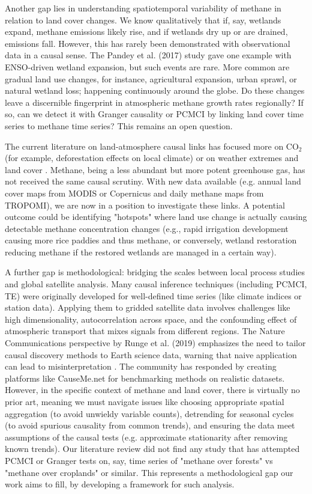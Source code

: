 Another gap lies in understanding spatiotemporal variability of methane in relation to land cover changes. We know qualitatively that if, say, wetlands expand, methane emissions likely rise, and if wetlands dry up or are drained, emissions fall. However, this has rarely been demonstrated with observational data in a causal sense. The Pandey et al. (2017) \cite{Pandey2017} study gave one example with ENSO-driven wetland expansion, but such events are rare. More common are gradual land use changes, for instance, agricultural expansion, urban sprawl, or natural wetland loss; happening continuously around the globe. Do these changes leave a discernible fingerprint in atmospheric methane growth rates regionally? If so, can we detect it with Granger causality or PCMCI by linking land cover time series to methane time series? This remains an open question. 


The current literature on land-atmosphere causal links has focused more on CO$_2$ (for example, deforestation effects on local climate) or on weather extremes and land cover \cite{Kovacs2023}. Methane, being a less abundant but more potent greenhouse gas, has not received the same causal scrutiny. With new data available (e.g. annual land cover maps from MODIS or Copernicus and daily methane maps from TROPOMI), we are now in a position to investigate these links. A potential outcome could be identifying "hotspots" where land use change is actually causing detectable methane concentration changes (e.g., rapid irrigation development causing more rice paddies and thus methane, or conversely, wetland restoration reducing methane if the restored wetlands are managed in a certain way).

A further gap is methodological: bridging the scales between local process studies and global satellite analysis. Many causal inference techniques (including PCMCI, TE) were originally developed for well-defined time series (like climate indices or station data). Applying them to gridded satellite data involves challenges like high dimensionality, autocorrelation across space, and the confounding effect of atmospheric transport that mixes signals from different regions. The Nature Communications perspective by Runge et al. (2019) \cite{Runge2019} emphasizes the need to tailor causal discovery methods to Earth science data, warning that naive application can lead to misinterpretation \cite{Runge2019}. The community has responded by creating platforms like CauseMe.net \cite{Runge2019, Runge2019_2, MunozMari2020} for benchmarking methods on realistic datasets. However, in the specific context of methane and land cover, there is virtually no prior art, meaning we must navigate issues like choosing appropriate spatial aggregation (to avoid unwieldy variable counts), detrending for seasonal cycles (to avoid spurious causality from common trends), and ensuring the data meet assumptions of the causal tests (e.g. approximate stationarity after removing known trends). Our literature review did not find any study that has attempted PCMCI or Granger tests on, say, time series of "methane over forests" vs "methane over croplands" or similar. This represents a methodological gap our work aims to fill, by developing a framework for such analysis.


